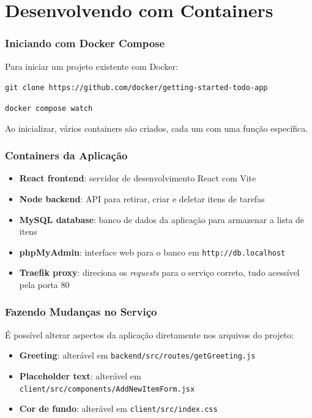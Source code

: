 \section{Desenvolvendo com Containers}

\begin{frame}
  \frametitle{Iniciando com Docker Compose}
  Para iniciar um projeto existente com Docker:

  \vspace{0.5em}
  \texttt{git clone https://github.com/docker/getting-started-todo-app}

  \vspace{0.3em}
  \texttt{docker compose watch}

  \vspace{0.5em}
  Ao inicializar, vários containers são criados, cada um com uma função específica.
\end{frame}

\begin{frame}
  \frametitle{Containers da Aplicação}
  \begin{itemize}
    \item \textbf{React frontend}: servidor de desenvolvimento React com Vite
    \item \textbf{Node backend}: API para retirar, criar e deletar itens de tarefas
    \item \textbf{MySQL database}: banco de dados da aplicação para armazenar a lista de itens
    \item \textbf{phpMyAdmin}: interface web para o banco em \texttt{http://db.localhost}
    \item \textbf{Traefik proxy}: direciona os \textit{requests} para o serviço correto, tudo acessível pela porta 80
  \end{itemize}
\end{frame}

\begin{frame}
  \frametitle{Fazendo Mudanças no Serviço}
  É possível alterar aspectos da aplicação diretamente nos arquivos do projeto:

  \vspace{0.5em}
  \begin{itemize}
    \item \textbf{Greeting}: alterável em \texttt{backend/src/routes/getGreeting.js}
    \item \textbf{Placeholder text}: alterável em \texttt{client/src/components/AddNewItemForm.jsx}
    \item \textbf{Cor de fundo}: alterável em \texttt{client/src/index.css}
  \end{itemize}
\end{frame}

